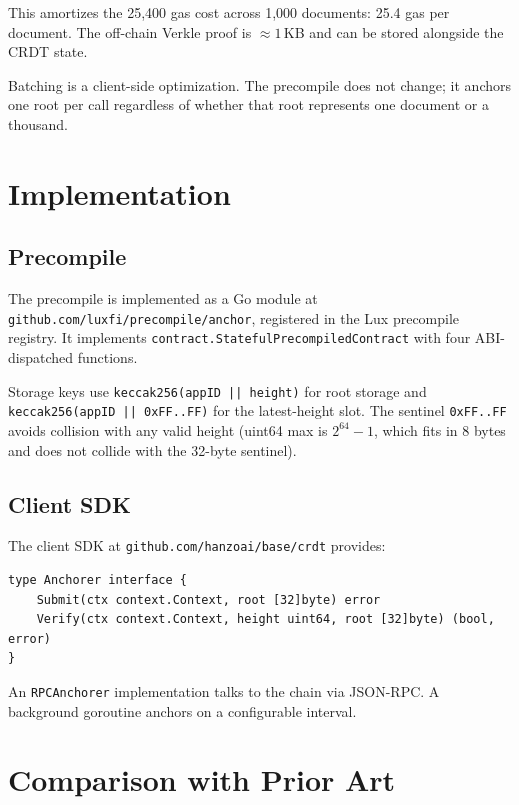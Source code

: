 \documentclass[11pt,a4paper]{article}
\begin{document}
\noindent
This amortizes the 25,400 gas cost across 1,000 documents: 25.4 gas per
document. The off-chain Verkle proof is $\approx 1$\,KB and can be stored
alongside the CRDT state.

Batching is a client-side optimization. The precompile does not change;
it anchors one root per call regardless of whether that root represents
one document or a thousand.

\section{Implementation}
\label{sec:implementation}

\subsection{Precompile}

The precompile is implemented as a Go module at
\texttt{github.com/luxfi/precompile/anchor}, registered in the Lux
precompile registry. It implements
\texttt{contract.StatefulPrecompiledContract} with four ABI-dispatched
functions.

Storage keys use \texttt{keccak256(appID || height)} for root storage
and \texttt{keccak256(appID || 0xFF..FF)} for the latest-height slot.
The sentinel \texttt{0xFF..FF} avoids collision with any valid height
(uint64 max is $2^{64}-1$, which fits in 8 bytes and does not collide
with the 32-byte sentinel).

\subsection{Client SDK}

The client SDK at \texttt{github.com/hanzoai/base/crdt} provides:

\begin{lstlisting}
type Anchorer interface {
    Submit(ctx context.Context, root [32]byte) error
    Verify(ctx context.Context, height uint64, root [32]byte) (bool, error)
}
\end{lstlisting}

An \texttt{RPCAnchorer} implementation talks to the chain via JSON-RPC.
A background goroutine anchors on a configurable interval.

\section{Comparison with Prior Art}
\label{sec:comparison}
\end{document}

